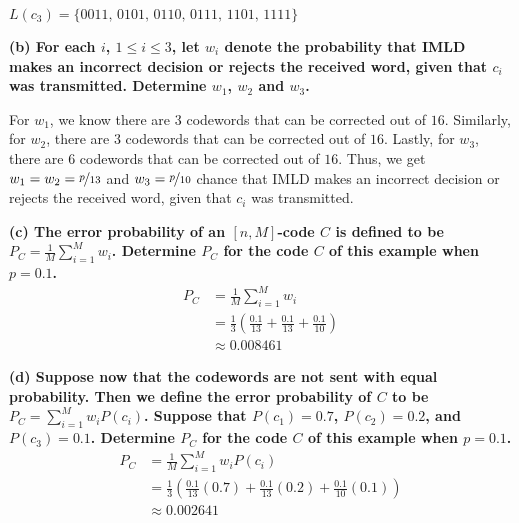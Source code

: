 $ L(c_3)=\{0011,\,0101,\,0110,\,0111,\,1101,\,1111\} $

\textbf{(b) For each $i$, $1 \leq i \leq 3$, let $w_i$ denote the probability that
IMLD makes an incorrect decision or rejects the received word, given that
$c_i$ was transmitted. Determine $w_1$, $w_2$ and $w_3$.}

For $ w_1 $, we know there are $ 3 $ codewords that can be corrected out of
$ 16 $. Similarly, for $ w_2 $, there are $ 3 $ codewords that can be corrected
out of $ 16 $. Lastly, for $ w_3 $, there are $ 6 $ codewords that can be
corrected out of $ 16 $. Thus, we get $ w_1=w_2=\nicefrac{p}{13} $ and
$ w_3=\nicefrac{p}{10} $ chance that IMLD makes an incorrect decision
or rejects the received word, given that $ c_i $ was transmitted.

\textbf{(c) The error probability of an $[n,M]$-code $C$ is defined to be
$P_C = \frac{1}{M}\sum_{i=1}^M w_i$. Determine $P_C$ for the code $C$ of
this example when $p=0.1$.}
\begin{align*}
    P_C&=\frac{1}{M}\sum_{i=1}^M w_i\\
    &=\frac{1}{3}\left( \frac{0.1}{13} + \frac{0.1}{13} + \frac{0.1}{10} \right)\\
    &\approx 0.008461
\end{align*}

\textbf{(d) Suppose now that the codewords are not sent with equal probability.
Then we define the error probability of $C$ to be
$P_C = \sum_{i=1}^M w_i P(c_i)$. Suppose that $P(c_1)=0.7$, $P(c_2)=0.2$,
and $P(c_3)=0.1$. Determine $P_C$ for the code $C$ of this
example when $p=0.1$.}
\begin{align*}
    P_C&=\frac{1}{M}\sum_{i=1}^M w_iP(c_i)\\
    &=\frac{1}{3}\left( \frac{0.1}{13}(0.7) + \frac{0.1}{13}(0.2) + \frac{0.1}{10}(0.1) \right)\\
    &\approx 0.002641
\end{align*}


